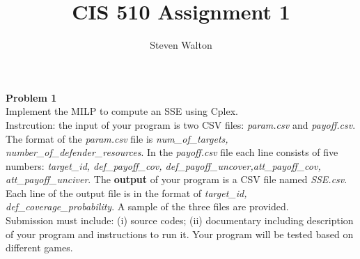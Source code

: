 \documentclass[12pt,letter]{article}
\newcommand{\problem}[1]{\vspace{3mm}\Large\textbf{{Problem {#1}\vspace{3mm}}}\normalsize\\}
\begin{document}
\title{CIS 510 Assignment 1}
\author{Steven Walton}
\maketitle
\problem{1}
Implement the MILP to compute an SSE using Cplex.
\\
Instrcution: the input of your program is two CSV files: \textit{param.csv} and
\textit{payoff.csv}. The format of the \textit{param.csv} file is 
\textit{num\_of\_targets, number\_of\_defender\_resources}. In the \textit{payoff.csv} file
each line consists of five numbers: \textit{target\_id, def\_payoff\_cov, 
def\_payoff\_uncover,att\_payoff\_cov, att\_payoff\_unciver}. The \textbf{output}
of your program is a CSV file named \textit{SSE.csv}. Each line of the output file 
is in the format of \textit{target\_id, def\_coverage\_probability}. A sample
of the three files are provided. 
\\
Submission must include: (i) source codes; (ii) documentary including description
of your program and instructions to run it. Your program will be tested based on
different games.
\end{document}
